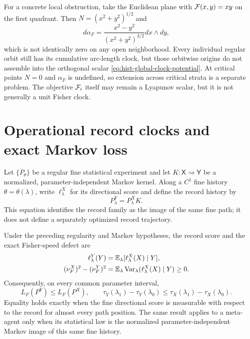 For a concrete local obstruction, take the Euclidean plane with
$\mathcal F(x,y)=xy$ on the first quadrant.  Then
$N=(x^2+y^2)^{1/2}$ and
\begin{equation}
d\alpha_F
=\frac{x^2-y^2}{(x^2+y^2)^{3/2}}dx\wedge dy,
\label{eq:hist-nonexact-clock-example}
\end{equation}
which is not identically zero on any open neighborhood.  Every individual
regular orbit still has its cumulative arc-length clock, but those orbitwise
origins do not assemble into the orthogonal scalar
\eqref{eq:hist-global-clock-potential}.  At critical points $N=0$ and
$\alpha_F$ is undefined, so extension across critical strata is a separate
problem.  The objective $\mathcal F_i$ itself may remain a Lyapunov scalar, but
it is not generally a unit Fisher clock.  

\section{Operational record clocks and exact Markov loss}
\label{sec:hist-record-clocks}

Let $\{P_\theta\}$ be a regular fine statistical experiment and let
$K:\mathsf X\rightsquigarrow\mathsf Y$ be a normalized,
parameter-independent Markov kernel.  Along a $C^1$ fine history
$\theta=\theta(\lambda)$, write $\ell^X_\lambda$ for its directional score
and define the record history by
\begin{equation}
P^Y_\lambda=P^X_\lambda K.
\label{eq:hist-same-path-markov-image}
\end{equation}
This equation identifies the record family as the image of the same fine
path; it does not define a separately optimized record trajectory.

Under the preceding regularity and Markov hypotheses, the record score and
the exact Fisher-speed defect are
\begin{align}
\ell^Y_\lambda(Y)
&=\mathbb E_\lambda[\ell^X_\lambda(X)\mid Y],
\label{eq:hist-record-score-projection}\\
(\nu^X_F)^2-(\nu^Y_F)^2
&=\mathbb E_\lambda\operatorname{Var}_\lambda
(\ell^X_\lambda(X)\mid Y)
\geq0.
\label{eq:hist-record-conditional-variance-defect}
\end{align}
Consequently, on every common parameter interval,
\begin{equation}
L_F(P^Y)\leq L_F(P^X),
\qquad
\tau_Y(\lambda_1)-\tau_Y(\lambda_0)
\leq
\tau_X(\lambda_1)-\tau_X(\lambda_0).
\label{eq:hist-record-clock-contraction}
\end{equation}
Equality holds exactly when the fine directional score is measurable with
respect to the record for almost every path position.  The same result
applies to a meta-agent only when its statistical law is the normalized
parameter-independent Markov image of this same fine history.

